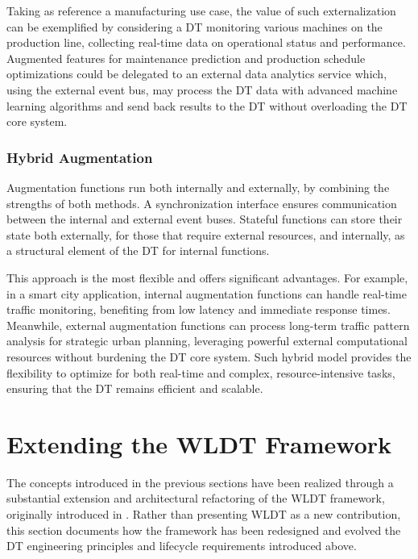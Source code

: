 Taking as reference a manufacturing use case, the value of such externalization can be exemplified by considering a \ac{DT} monitoring various machines on the production line, collecting real-time data on operational status and performance.
Augmented features for maintenance prediction and production schedule optimizations could be delegated to an external data analytics service which, using the external event bus, may process the \ac{DT} data with advanced machine learning algorithms and send back results to the \ac{DT} without overloading the \ac{DT} core system.

\subsubsection{Hybrid Augmentation}
Augmentation functions run both internally and externally, by combining the strengths of both methods.
A synchronization interface ensures communication between the internal and external event buses.
%
Stateful functions can store their state both externally, for those that require external resources, and internally, as a structural element of the \ac{DT} for internal functions.

This approach is the most flexible and offers significant advantages.
For example, in a smart city application, internal augmentation functions can handle real-time traffic monitoring, benefiting from low latency and immediate response times.
Meanwhile, external augmentation functions can process long-term traffic pattern analysis for strategic urban planning, leveraging powerful external computational resources without burdening the \ac{DT} core system.
%
Such hybrid model provides the flexibility to optimize for both real-time and complex, resource-intensive tasks, ensuring that the \ac{DT} remains efficient and scalable.

\section{Extending the \acl{WLDT} Framework}
\label{sec:dte:engineering-dt:wldt-framework}

The concepts introduced in the previous sections have been realized through a substantial extension and architectural refactoring of the \acf{WLDT} framework, originally introduced in \cite{PICONE2021100661}.
%
Rather than presenting WLDT as a new contribution, this section documents how the framework has been redesigned and evolved the \ac{DT} engineering principles and lifecycle requirements introduced above.

